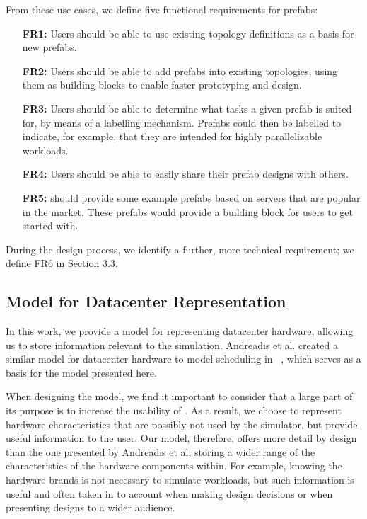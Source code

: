 \documentclass[11pt]{article}
\begin{document}
		From these use-cases, we define five functional requirements for prefabs:
		\begin{itemize}
			\item [\textbf{FR1:}] Users should be able to use existing topology definitions as a basis for new prefabs.
			\item [\textbf{FR2:}] Users should be able to add prefabs into existing topologies, using them as building blocks to enable faster prototyping and design.
			\item [\textbf{FR3:}] Users should be able to determine what tasks a given prefab is suited for, by means of a labelling mechanism. Prefabs could then be labelled to indicate, for example, that they are intended for highly parallelizable workloads.
			\item [\textbf{FR4:}] Users should be able to easily share their prefab designs with others.
			\item [\textbf{FR5:}] \opendc{} should provide some example prefabs based on servers that are popular in the market. These prefabs would provide a building block for users to get started with.
		\end{itemize}

		During the design process, we identify a further, more technical requirement; we define FR6 in Section 3.3.

	\subsection{Model for Datacenter Representation}
		In this work, we provide a model for representing datacenter hardware, allowing us to store information  relevant to the simulation. Andreadis et al. created a similar model for datacenter hardware to model scheduling in \opendc{}~\cite{Andreadis2018}, which serves as a basis for the model presented here. 
		
		When designing the model, we find it important to consider that a large part of its purpose is to increase the usability of \opendc{}. 
		As a result, we choose to represent hardware characteristics that are possibly not used by the simulator, but provide useful information to the user. 
		Our model, therefore, offers more detail by design than the one presented by Andreadis et al, storing a wider range of the characteristics of the hardware components within.
		For example, knowing the hardware brands is not necessary to simulate workloads, but such information is useful and often taken in to account when making design decisions or when presenting designs to a wider audience.
\end{document}

